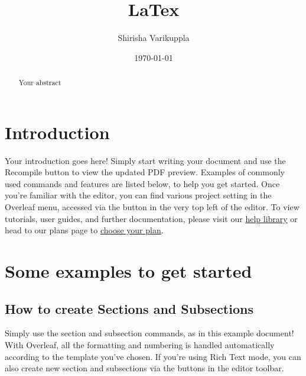 \documentclass{article}
\title{LaTex}
\author{Shirisha Varikuppla}
\date{\today}
\begin{document}
	\tableofcontents
	\maketitle
	\begin{abstract}Your abstract	
\end{abstract}
	\section{Introduction}
	Your introduction goes here! Simply start writing your document and use the Recompile button to
	view the updated PDF preview. Examples of commonly used commands and features are listed below,
	to help you get started.
	Once you’re familiar with the editor, you can find various project setting in the Overleaf menu,
	accessed via the button in the very top left of the editor. To view tutorials, user guides, and further
	documentation, please visit our \href{https://www.overleaf.com/learn}{help library}
	 or head to our plans page to \href{https://www.overleaf.com/user/subscription/plans}{choose your plan}.
	\section{Some examples to get started}
	\subsection{How to create Sections and Subsections}
	Simply use the section and subsection commands, as in this example document! With Overleaf, all
	the formatting and numbering is handled automatically according to the template you’ve chosen. If
	you’re using Rich Text mode, you can also create new section and subsections via the buttons in the
	editor toolbar.
\end{document}
